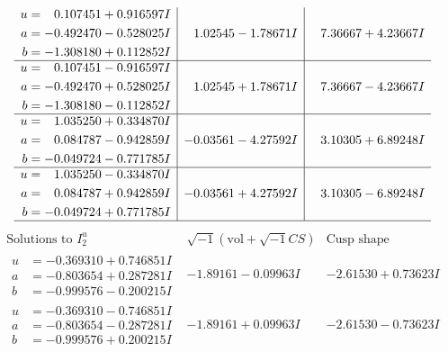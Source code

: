 \documentclass[1p]{elsarticle_modified}
\theoremstyle{definition}
\newcommand{\I}{\sqrt{-1}}
\begin{document}
$$\begin{array}{c|c|c}
\begin{aligned}
u &= \phantom{-}0.107451 + 0.916597 I \\
a &= -0.492470 - 0.528025 I \\
b &= -1.308180 + 0.112852 I\end{aligned}
 & \phantom{-}1.02545 - 1.78671 I & \phantom{-}7.36667 + 4.23667 I \\ \hline\begin{aligned}
u &= \phantom{-}0.107451 - 0.916597 I \\
a &= -0.492470 + 0.528025 I \\
b &= -1.308180 - 0.112852 I\end{aligned}
 & \phantom{-}1.02545 + 1.78671 I & \phantom{-}7.36667 - 4.23667 I \\ \hline\begin{aligned}
u &= \phantom{-}1.035250 + 0.334870 I \\
a &= \phantom{-}0.084787 - 0.942859 I \\
b &= -0.049724 - 0.771785 I\end{aligned}
 & -0.03561 - 4.27592 I & \phantom{-}3.10305 + 6.89248 I \\ \hline\begin{aligned}
u &= \phantom{-}1.035250 - 0.334870 I \\
a &= \phantom{-}0.084787 + 0.942859 I \\
b &= -0.049724 + 0.771785 I\end{aligned}
 & -0.03561 + 4.27592 I & \phantom{-}3.10305 - 6.89248 I\\
 \hline 
 \end{array}$$\newpage$$\begin{array}{c|c|c}  
\text{Solutions to }I^u_{2}& \I (\text{vol} + \sqrt{-1}CS) & \text{Cusp shape}\\
 \hline 
\begin{aligned}
u &= -0.369310 + 0.746851 I \\
a &= -0.803654 + 0.287281 I \\
b &= -0.999576 - 0.200215 I\end{aligned}
 & -1.89161 - 0.09963 I & -2.61530 + 0.73623 I \\ \hline\begin{aligned}
u &= -0.369310 - 0.746851 I \\
a &= -0.803654 - 0.287281 I \\
b &= -0.999576 + 0.200215 I\end{aligned}
 & -1.89161 + 0.09963 I & -2.61530 - 0.73623 I \\ \hline\begin{aligned}

\end{aligned}
\end{array}$$
\end{document}
